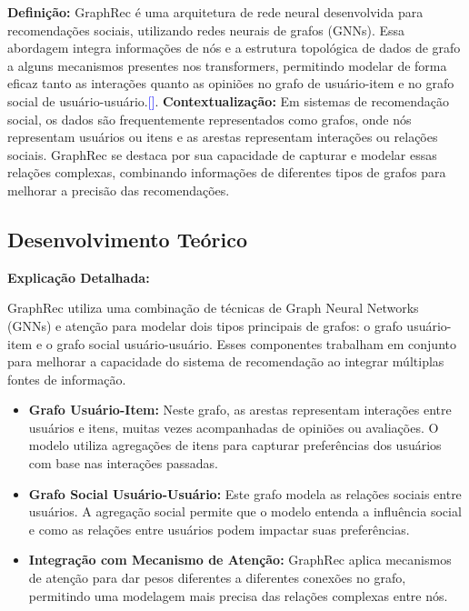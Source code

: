 \textbf{Definição:}  
GraphRec é uma arquitetura de rede neural desenvolvida para recomendações sociais, utilizando redes neurais de grafos (GNNs). Essa abordagem integra informações de nós e a estrutura topológica de dados de grafo a alguns mecanismos presentes nos transformers, permitindo modelar de forma eficaz tanto as interações quanto as opiniões no grafo de usuário-item e no grafo social de usuário-usuário.\textcolor{blue}{[\cite{GraphRecWWW19}]}.
\textbf{Contextualização:}  
Em sistemas de recomendação social, os dados são frequentemente representados como grafos, onde nós representam usuários ou itens e as arestas representam interações ou relações sociais. GraphRec se destaca por sua capacidade de capturar e modelar essas relações complexas, combinando informações de diferentes tipos de grafos para melhorar a precisão das recomendações.

\subsection{Desenvolvimento Teórico}

\textbf{Explicação Detalhada:}

GraphRec utiliza uma combinação de técnicas de Graph Neural Networks (GNNs) e atenção para modelar dois tipos principais de grafos: o grafo usuário-item e o grafo social usuário-usuário. Esses componentes trabalham em conjunto para melhorar a capacidade do sistema de recomendação ao integrar múltiplas fontes de informação.

\begin{itemize}
    \item \textbf{Grafo Usuário-Item:}  
    Neste grafo, as arestas representam interações entre usuários e itens, muitas vezes acompanhadas de opiniões ou avaliações. O modelo utiliza agregações de itens para capturar preferências dos usuários com base nas interações passadas.

    \item \textbf{Grafo Social Usuário-Usuário:}  
    Este grafo modela as relações sociais entre usuários. A agregação social permite que o modelo entenda a influência social e como as relações entre usuários podem impactar suas preferências.

    \item \textbf{Integração com Mecanismo de Atenção:}  
    GraphRec aplica mecanismos de atenção para dar pesos diferentes a diferentes conexões no grafo, permitindo uma modelagem mais precisa das relações complexas entre nós.
\end{itemize}

